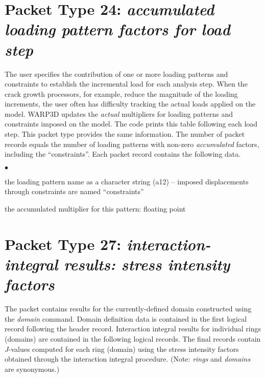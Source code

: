 \documentclass[10pt]{report}
\numberwithin{equation}{section}
\newcommand{\ti}{\emph}
\newcommand{\squishlist}{
 \begin{list}{$\bullet$}
  { \setlength{\itemsep}{0pt}
     \setlength{\parsep}{3pt}
     \setlength{\topsep}{3pt}
     \setlength{\partopsep}{0pt}
     \setlength{\leftmargin}{1.5em}
     \setlength{\labelwidth}{1em}
     \setlength{\labelsep}{0.5em} } }
\newcommand{\squishend}{
  \end{list}  }
\begin{document}
\section{Packet Type 24: \ti{accumulated loading pattern factors for load step}}
The user specifies the contribution of one or more loading patterns and 
constraints to establish the incremental load for each analysis step. 
When the crack growth processors, for example, reduce the magnitude 
of the loading increments, the user often has difficulty tracking the 
actual loads applied on the model. WARP3D updates the \ti{actual} 
multipliers for loading patterns and constraints imposed on the model. 
The code prints this table following each load step. This packet type 
provides the same information. The number of packet records equals 
the number of loading patterns with non-zero \ti{accumulated} factors, 
including the ``constraints''. Each packet record contains the following data.
\squishlist
\item the loading pattern name as a character string (a12) -- imposed 
displacements through constraints are named ``constraints''
\item the accumulated multiplier for this pattern: floating point
\squishend

%
%
\section{Packet Type 27: \ti{interaction-integral results: stress intensity factors}}
The packet contains results for the currently-defined domain constructed 
using the \ti{domain} command. Domain definition data is contained in 
the first logical record following the header record. Interaction integral 
results for individual rings (domains) are contained in the following logical records. 
The final records contain $J$-values computed for each ring (domain) using 
the stress intensity factors obtained through the interaction integral procedure.
(Note: \ti{rings} and \ti{domains} are synonymous.)
\end{document}
